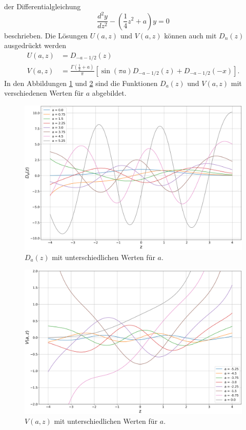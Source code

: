 der Differentialgleichung
\begin{equation}
    \frac{d^2 y}{d z^2} - \left(\frac{1}{4} z^2 + a\right) y = 0
\end{equation}
beschrieben. Die Lösungen $U(a,z)$ und $V(a, z)$ können auch mit $D_n(z)$
ausgedrückt werden
\begin{align}
    U(a,z) &= D_{-a-1/2}(z) \\
    V(a,z) &= \frac{\Gamma \left({\textstyle \frac{1}{2}} + a\right)}{\pi}
    \left[\sin\left(\pi a\right) D_{-a-1/2}(z) + D_{-a-1/2}(-x)\right].
\end{align}
In den Abbildungen \ref{parzyl:fig:dnz} und \ref{parzyl:fig:Vnz} sind 
die Funktionen $D_a(z)$ und $V(a,z)$ mit verschiedenen Werten für $a$ abgebildet.
\begin{figure}
    \centering
    \includegraphics[scale=0.3]{papers/parzyl/img/D_plot.png}
    \caption{$D_a(z)$ mit unterschiedlichen Werten für $a$.}
    \label{parzyl:fig:dnz}
\end{figure}
\begin{figure}
    \centering
    \includegraphics[scale=0.3]{papers/parzyl/img/v_plot.png}
    \caption{$V(a,z)$ mit unterschiedlichen Werten für $a$.}
    \label{parzyl:fig:Vnz}
\end{figure}